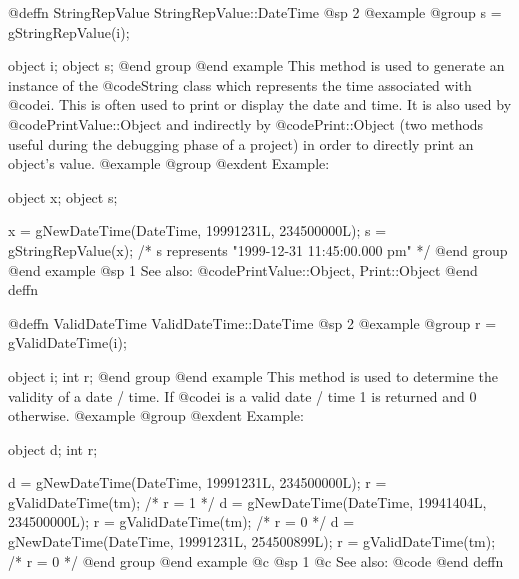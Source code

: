 @deffn {StringRepValue} StringRepValue::DateTime
@sp 2
@example
@group
s = gStringRepValue(i);

object  i;
object  s;
@end group
@end example
This method is used to generate an instance of the @code{String} class
which represents the time associated with @code{i}.  This is often
used to print or display the date and time.  It is also used by
@code{PrintValue::Object} and indirectly by @code{Print::Object}
(two methods useful during the debugging phase of a project)
in order to directly print an object's value.
@example
@group
@exdent Example:

object  x;
object  s;

x = gNewDateTime(DateTime, 19991231L, 234500000L);
s = gStringRepValue(x);
/*  s represents "1999-12-31 11:45:00.000 pm"   */
@end group
@end example
@sp 1
See also:  @code{PrintValue::Object, Print::Object}
@end deffn










@deffn {ValidDateTime} ValidDateTime::DateTime
@sp 2
@example
@group
r = gValidDateTime(i);

object  i;
int     r;
@end group
@end example
This method is used to determine the validity of a date / time.
If @code{i} is a valid date / time 1 is returned and 0 otherwise.
@example
@group
@exdent Example:

object  d;
int     r;

d = gNewDateTime(DateTime, 19991231L, 234500000L);
r = gValidDateTime(tm);   /*  r = 1  */
d = gNewDateTime(DateTime, 19941404L, 234500000L);
r = gValidDateTime(tm);   /*  r = 0  */
d = gNewDateTime(DateTime, 19991231L, 254500899L);
r = gValidDateTime(tm);   /*  r = 0  */
@end group
@end example
@c @sp 1
@c See also:  @code{}
@end deffn













